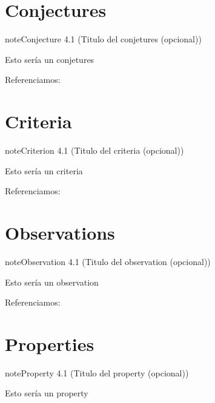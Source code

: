 \documentclass[letterpaper,10pt,english]{jupyterBook}
\begin{document}
\section{Conjectures}
\label{\detokenize{docs/04_00_Teoremas_pruebas_y_algoritmos:conjectures}}\label{docs/04_00_Teoremas_pruebas_y_algoritmos:my-conjecture}
\begin{sphinxadmonition}{note}{Conjecture 4.1 (Titulo del conjetures (opcional))}



\sphinxAtStartPar
Esto sería un conjetures
\end{sphinxadmonition}

\sphinxAtStartPar
Referenciamos: {\hyperref[\detokenize{docs/04_00_Teoremas_pruebas_y_algoritmos:my-conjecture}]{}}


\section{Criteria}
\label{\detokenize{docs/04_00_Teoremas_pruebas_y_algoritmos:criteria}}\label{docs/04_00_Teoremas_pruebas_y_algoritmos:my-criteria}
\begin{sphinxadmonition}{note}{Criterion 4.1 (Titulo del criteria (opcional))}



\sphinxAtStartPar
Esto sería un criteria
\end{sphinxadmonition}

\sphinxAtStartPar
Referenciamos: {\hyperref[\detokenize{docs/04_00_Teoremas_pruebas_y_algoritmos:my-criteria}]{}}


\section{Observations}
\label{\detokenize{docs/04_00_Teoremas_pruebas_y_algoritmos:observations}}\label{docs/04_00_Teoremas_pruebas_y_algoritmos:my-observation}
\begin{sphinxadmonition}{note}{Observation 4.1 (Titulo del observation (opcional))}



\sphinxAtStartPar
Esto sería un observation
\end{sphinxadmonition}

\sphinxAtStartPar
Referenciamos: {\hyperref[\detokenize{docs/04_00_Teoremas_pruebas_y_algoritmos:my-observation}]{}}


\section{Properties}
\label{\detokenize{docs/04_00_Teoremas_pruebas_y_algoritmos:properties}}\label{docs/04_00_Teoremas_pruebas_y_algoritmos:my-property}
\begin{sphinxadmonition}{note}{Property 4.1 (Titulo del property (opcional))}



\sphinxAtStartPar
Esto sería un property
\end{sphinxadmonition}
\end{document}
